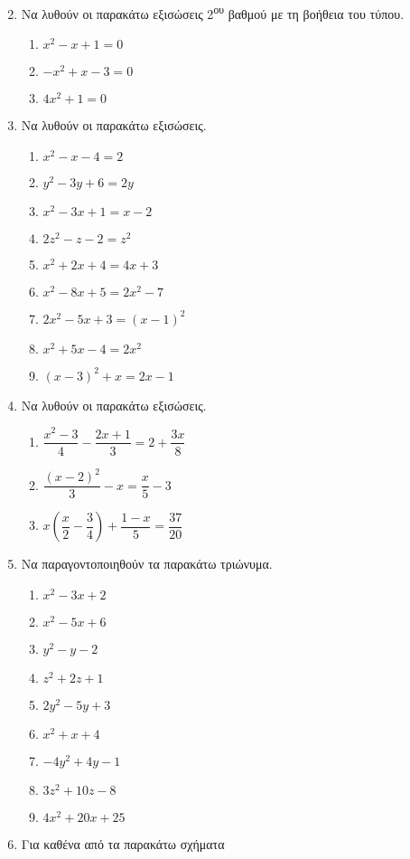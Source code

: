 \documentclass[twoside]{article}
\begin{document}
\begin{enumerate}
\begin{multicols}{3}
\end{multicols}
\item Να λυθούν οι παρακάτω εξισώσεις 2\textsuperscript{ου} βαθμού με τη βοήθεια του τύπου.
\begin{multicols}{3}
\begin{enumerate}[label=\roman*.]
\item $ x^2-x+1=0 $
\item $ -x^2+x-3=0 $
\item $ 4x^2+1=0 $
\end{enumerate}
\end{multicols}
\item Να λυθούν οι παρακάτω εξισώσεις.
\begin{multicols}{3}
\begin{enumerate}[label=\roman*.]
\item $ x^2-x-4=2 $
\item $ y^2-3y+6=2y $
\item $ x^2-3x+1=x-2 $
\item $ 2z^2-z-2=z^2 $
\item $ x^2+2x+4=4x+3 $
\item $ x^2-8x+5=2x^2-7 $
\item $ 2x^2-5x+3=(x-1)^2 $
\item $ x^2+5x-4=2x^2 $
\item $ (x-3)^2+x=2x-1 $
\end{enumerate}
\end{multicols}
\item Να λυθούν οι παρακάτω εξισώσεις.
\begin{multicols}{3}
\begin{enumerate}[label=\roman*.]
\item $ \dfrac{x^2-3}{4}-\dfrac{2x+1}{3}=2+\dfrac{3x}{8} $
\item $ \dfrac{(x-2)^2}{3}-x=\dfrac{x}{5}-3 $
\item $ x\left(\dfrac{x}{2}-\dfrac{3}{4} \right)+\dfrac{1-x}{5}=\dfrac{37}{20}  $
\end{enumerate}
\end{multicols}
\item Να παραγοντοποιηθούν τα παρακάτω τριώνυμα.
\begin{multicols}{3}
\begin{enumerate}[label=\roman*.]
\item $ x^2-3x+2 $
\item $ x^2-5x+6 $
\item $ y^2-y-2 $
\item $ z^2+2z+1 $
\item $ 2y^2-5y+3 $
\item $ x^2+x+4 $
\item $ -4y^2+4y-1 $
\item $ 3z^2+10z-8 $
\item $ 4x^2+20x+25 $
\end{enumerate}
\end{multicols}
\item Για καθένα από τα παρακάτω σχήματα 
\end{enumerate}
\end{document}
